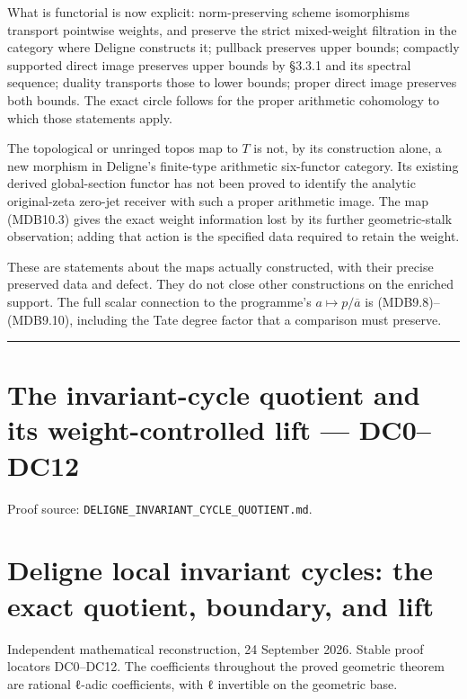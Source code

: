 \documentclass[
]{report}
\begin{document}
What is functorial is now explicit: norm-preserving scheme isomorphisms
transport pointwise weights, and preserve the strict mixed-weight
filtration in the category where Deligne constructs it; pullback
preserves upper bounds; compactly supported direct image preserves upper
bounds by §3.3.1 and its spectral sequence; duality transports those to
lower bounds; proper direct image preserves both bounds. The exact
circle follows for the proper arithmetic cohomology to which those
statements apply.

The topological or unringed topos map to \(T\) is not, by its
construction alone, a new morphism in Deligne's finite-type arithmetic
six-functor category. Its existing derived global-section functor has
not been proved to identify the analytic original-zeta zero-jet receiver
with such a proper arithmetic image. The map (MDB10.3) gives the exact
weight information lost by its further geometric-stalk observation;
adding that action is the specified data required to retain the weight.

These are statements about the maps actually constructed, with their
precise preserved data and defect. They do not close other constructions
on the enriched support. The full scalar connection to the programme's
\(a\mapsto p/\overline a\) is (MDB9.8)--(MDB9.10), including the Tate
degree factor that a comparison must preserve.

\begin{center}\rule{0.5\linewidth}{0.5pt}\end{center}

\chapter{The invariant-cycle quotient and its weight-controlled lift ---
DC0--DC12}\label{the-invariant-cycle-quotient-and-its-weight-controlled-lift-dc0dc12}

Proof source: \nolinkurl{DELIGNE_INVARIANT_CYCLE_QUOTIENT.md}.

\chapter{Deligne local invariant cycles: the exact quotient, boundary,
and
lift}\label{deligne-local-invariant-cycles-the-exact-quotient-boundary-and-lift}

Independent mathematical reconstruction, 24 September 2026. Stable proof
locators DC0--DC12. The coefficients throughout the proved geometric
theorem are rational ℓ-adic coefficients, with ℓ invertible on the
geometric base.
\end{document}
